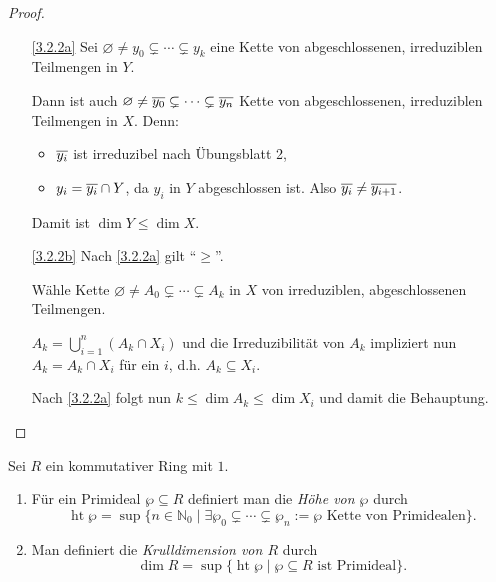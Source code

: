 \documentclass[a4paper,12pt,index=toc]{scrbook}
\theoremstyle{keinenummern} %
\newcommand{\hoehe}{\operatorname{ht}}
\newcommand{\leer}{\ensuremath{\varnothing}}
\newcommand{\set}[1]{\ensuremath{\mathbb{#1}}}
\newcommand{\N}{\set{N}}
\def\Bar#1{\ensuremath\overline{#1}}
\begin{document}
\begin{proof}
  \begin{enumerate}
  \item[\ref{3.2.2a}] Sei $\leer \neq y_0 \subsetneq \dotsm \subsetneq y_k$ eine Kette von abgeschlossenen, irreduziblen Teilmengen in $Y$.

Dann ist auch $\leer \neq \Bar{y_0} \subsetneq \dotsm \subsetneq \Bar{y_n}$ Kette von abgeschlossenen, irreduziblen Teilmengen in $X$. Denn:
  \begin{itemize}
     \item $\Bar{y_i}$ ist irreduzibel nach Übungsblatt 2,
     \item $y_i=\Bar{y_i} \cap Y$, da $y_i$ in $Y$ abgeschlossen ist. Also $\Bar{y_i}\neq \Bar{y_{i+1}}$.
   \end{itemize}
Damit ist $\dim Y\le \dim X$.  
  \item[\ref{3.2.2b}] Nach \ref{3.2.2a} gilt \enquote{$\geq$}.

Wähle Kette $\leer \neq A_0 \subsetneq \dotsm \subsetneq A_k$ in $X$ von irreduziblen, abgeschlossenen Teilmengen.

$A_k=\bigcup\limits_{i=1}^{n} (A_k \cap X_i)$ und die Irreduzibilität von $A_k$ impliziert nun $A_k=A_k \cap X_i$ für ein $i$, d.h. $A_k\subseteq X_i$.

Nach \ref{3.2.2a} folgt nun $k \le \dim A_k \le \dim X_i$ und damit die Behauptung.
 \end{enumerate}
\end{proof}

\begin{erinnerung}\label{3.2.3}
Sei $R$ ein kommutativer Ring mit $1$.
  \begin{enumerate}
  \item{} Für ein Primideal $\wp \subseteq R$ definiert man die \emph{Höhe von $\wp$} durch
  \begin{equation*} \hoehe\wp=\sup \{n\in \N_0 \mid\exists \wp_0 \subsetneq \dotsm \subsetneq \wp_n:=\wp \text{ Kette von Primidealen}\}.\end{equation*}
  \item{} Man definiert die \emph{Krulldimension von $R$} durch
  \begin{equation*}\dim R=\sup\{\hoehe\wp \mid \wp \subseteq R \text { ist Primideal}\}.\end{equation*} 
  \end{enumerate}
\end{erinnerung}
\end{document}
